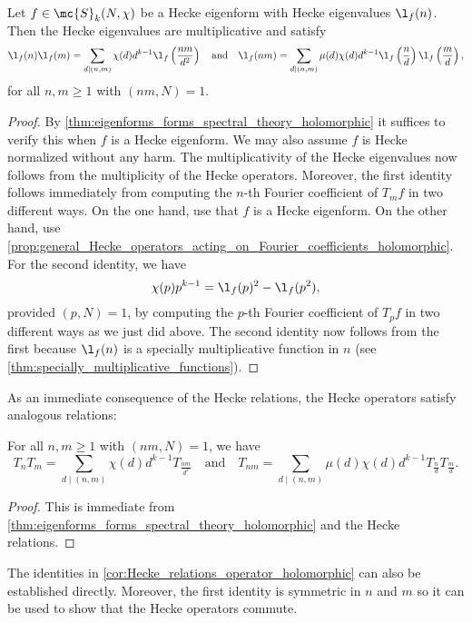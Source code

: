     \begin{proposition}
    Let $f \in \mc{S}_{k}(N,\chi)$ be a Hecke eigenform with Hecke eigenvalues $\l_{f}(n)$. Then the Hecke eigenvalues are multiplicative and satisfy
    \[
      \l_{f}(n)\l_{f}(m) = \sum_{d \mid (n,m)}\chi(d)d^{k-1}\l_{f}\left(\frac{nm}{d^{2}}\right) \quad \text{and} \quad \l_{f}(nm) = \sum_{d \mid (n,m)}\mu(d)\chi(d)d^{k-1}\l_{f}\left(\frac{n}{d}\right)\l_{f}\left(\frac{m}{d}\right),
    \]
    for all $n,m \ge 1$ with $(nm,N) = 1$.
    \end{proposition}
    \begin{proof}
      By \cref{thm:eigenforms_forms_spectral_theory_holomorphic} it suffices to verify this when $f$ is a Hecke eigenform. We may also assume $f$ is Hecke normalized without any harm. The multiplicativity of the Hecke eigenvalues now follows from the multiplicity of the Hecke operators. Moreover, the first identity follows immediately from computing the $n$-th Fourier coefficient of $T_{m}f$ in two different ways. On the one hand, use that $f$ is a Hecke eigenform. On the other hand, use \cref{prop:general_Hecke_operators_acting_on_Fourier_coefficients_holomorphic}. For the second identity, we have
      \[
        \chi(p)p^{k-1} = \l_{f}(p)^{2}-\l_{f}(p^{2}),
      \]
      provided $(p,N) = 1$, by computing the $p$-th Fourier coefficient of $T_{p}f$ in two different ways as we just did above. The second identity now follows from the first because $\l_{f}(n)$ is a specially multiplicative function in $n$ (see \cref{thm:specially_multiplicative_functions}).
    \end{proof}

    As an immediate consequence of the Hecke relations, the Hecke operators satisfy analogous relations:

    \begin{corollary}\label{cor:Hecke_relations_operator_holomorphic}
      For all $n,m \ge 1$ with $(nm,N) = 1$, we have
      \[
        T_{n}T_{m} = \sum_{d \mid (n,m)}\chi(d)d^{k-1}T_{\frac{nm}{d^{2}}} \quad \text{and} \quad T_{nm} = \sum_{d \mid (n,m)}\mu(d)\chi(d)d^{k-1}T_{\frac{n}{d}}T_{\frac{m}{d}}.
      \]
    \end{corollary}
    \begin{proof}
      This is immediate from \cref{thm:eigenforms_forms_spectral_theory_holomorphic} and the Hecke relations.
    \end{proof}

    The identities in \cref{cor:Hecke_relations_operator_holomorphic} can also be established directly. Moreover, the first identity is symmetric in $n$ and $m$ so it can be used to show that the Hecke operators commute.
